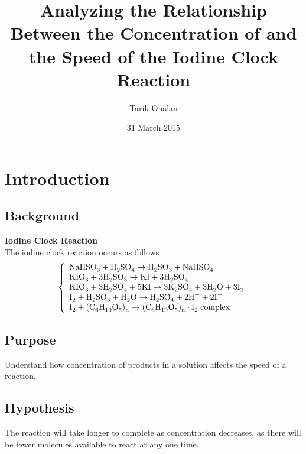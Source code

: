 \documentclass[a4paper]{article}
\title{Analyzing the Relationship Between the Concentration of \ce{KIO3} and the
Speed of the Iodine Clock Reaction}
\date{31 March 2015}
\author{Tarik Onalan}
\begin{document}
    \maketitle
    \section{Introduction}
        \subsection{Background}
            \begin{center}
                \textbf{Iodine Clock Reaction}
                \\
                The iodine clock reaction occurs as follows
                \begin{equation}
                    \left\{
                        \begin{array}{l}
                            \ce{NaHSO3}+\ce{H2SO4}\to{}\ce{H2SO3}+\ce{NaHSO4} \\
                            \ce{KIO3}+3\ce{H2SO3}\to{}\ce{KI}+3\ce{H2SO4} \\
                            \ce{KIO3}+3\ce{H2SO4}+5\ce{KI}\to{}3\ce{K2SO4}+3\ce{H2O}+3\ce{I2} \\
                            \ce{I2}+\ce{H2SO3}+\ce{H2O}\to{}\ce{H2SO4}+2\ce{H+}+2\ce{I-} \\
                            \ce{I2}+\ce{(C6H10O5)_n}\to{}\ce{(C6H10O5)_n}\cdot\ce{I2}\; \text{complex}
                        \end{array}
                    \right.
                \end{equation}
            \end{center}
        \subsection{Purpose}
            Understand how concentration of products in a solution affects the speed
            of a reaction.
        \subsection{Hypothesis}
            The reaction will take longer to complete  as  concentration decreases,
            as there will be fewer  molecules available to react at any one time.
\end{document}
